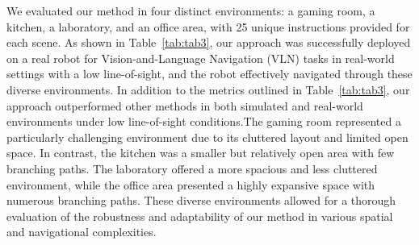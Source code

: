 We evaluated our method in four distinct environments: a gaming room, a kitchen, a laboratory, and an office area, with 25 unique instructions provided for each scene. As shown in Table~\ref{tab:tab3}, our approach was successfully deployed on a real robot for Vision-and-Language Navigation (VLN) tasks in real-world settings with a low line-of-sight, and the robot effectively navigated through these diverse environments. In addition to the metrics outlined in Table~\ref{tab:tab3}, our approach outperformed other methods in both simulated and real-world environments under low line-of-sight conditions.The gaming room represented a particularly challenging environment due to its cluttered layout and limited open space. In contrast, the kitchen was a smaller but relatively open area with few branching paths. The laboratory offered a more spacious and less cluttered environment, while the office area presented a highly expansive space with numerous branching paths. These diverse environments allowed for a thorough evaluation of the robustness and adaptability of our method in various spatial and navigational complexities. 








